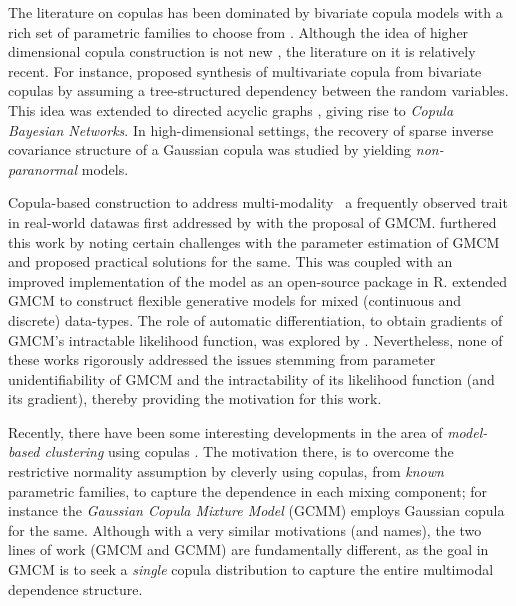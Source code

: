\documentclass{article}
\theoremstyle{plain}
\theoremstyle{definition}
\theoremstyle{remark}
\begin{document}
The literature on copulas has been dominated by bivariate copula models with a rich set of parametric families to choose from \citep{Nelsen1999introduction}. Although the idea of higher dimensional copula construction is not new \citep[see][]{Genest1995Multivariate, Joe1993Multivariate,Kojadinovic2010RpackageMVcopula}, the literature on it is relatively recent. For instance, \citet{Bedford2002,Kurowicka2009Book,Czado2010PairCopula} proposed  synthesis of multivariate copula from bivariate copulas by assuming a tree-structured dependency between the random variables. This idea was extended to directed acyclic graphs \citep[see][]{Elidan2010,Hanea2006CBN},  giving rise to \emph{Copula Bayesian Networks}. In high-dimensional settings, the recovery of sparse inverse covariance structure of a Gaussian copula was studied by \citet{Liu2009} yielding  \emph{non-paranormal} models.

Copula-based construction to address multi-modality \textemdash \ a frequently observed trait in real-world data\textemdash was first addressed by \citet{Tewari2011} with the proposal of GMCM. \citet{Bilgrau2016} furthered this work by noting certain challenges with the parameter estimation of GMCM and proposed practical solutions for the same. This was coupled with an improved implementation of the model as an open-source package \citep{Bilgrau_Rpackage} in R. \citet{Rajan2016_GMCM_mixed_data} extended GMCM to construct flexible generative models for mixed (continuous and discrete) data-types. The role of automatic differentiation, to obtain gradients of GMCM's intractable likelihood function, was explored by \citet{kasa2018}. Nevertheless, none of these works rigorously addressed the issues stemming from parameter unidentifiability of GMCM and the intractability of its likelihood function (and its gradient), thereby providing the motivation for this work.

Recently, there have been some interesting developments in the area of \emph{model-based clustering} using copulas \citep{Kosmidis2016,Mazo2017,Marbac2017,Rey2012_CopulaMixture}. The motivation there, is to overcome the restrictive normality assumption by cleverly using copulas, from \emph{known} parametric families, to capture the dependence in each mixing component; for instance the \emph{Gaussian Copula Mixture Model} (GCMM) \citep{Marbac2017} employs Gaussian copula for the same. Although with a very similar motivations (and names), the two lines of work (GMCM and GCMM) are fundamentally different, as the goal in GMCM is to seek a \emph{single} copula distribution to capture the entire multimodal dependence structure. 
\end{document}
